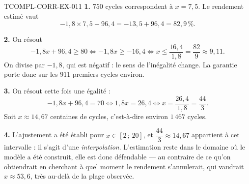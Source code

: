 \begin{corrige}{TCOMPL-CORR-EX-011}
\textbf{1.} $750$ cycles correspondent à $x=7{,}5$. Le rendement estimé vaut
\[
  -1{,}8\times 7{,}5+96{,}4=-13{,}5+96{,}4=82{,}9\,\%.
\]

\textbf{2.} On résout
\[
  -1{,}8x+96{,}4\geqslant 80
  \iff -1{,}8x\geqslant -16{,}4
  \iff x\leqslant \dfrac{16{,}4}{1{,}8}=\dfrac{82}{9}\approx 9{,}11.
\]
On divise par $-1{,}8$, qui est négatif : le sens de l'inégalité change. La
garantie porte donc sur les $911$ premiers cycles environ.

\textbf{3.} On résout cette fois une égalité :
\[
  -1{,}8x+96{,}4=70 \iff 1{,}8x=26{,}4 \iff x=\dfrac{26{,}4}{1{,}8}=\dfrac{44}{3}.
\]
Soit $x\approx 14{,}67$ centaines de cycles, c'est-à-dire environ $1\,467$ cycles.

\textbf{4.} L'ajustement a été établi pour $x\in[2\,;\,20]$, et
$\dfrac{44}{3}\approx 14{,}67$ appartient à cet intervalle : il s'agit d'une
\emph{interpolation}. L'estimation reste dans le domaine où le modèle a été
construit, elle est donc défendable — au contraire de ce qu'on obtiendrait en
cherchant à quel moment le rendement s'annulerait, qui vaudrait
$x\approx 53{,}6$, très au-delà de la plage observée.
\end{corrige}
